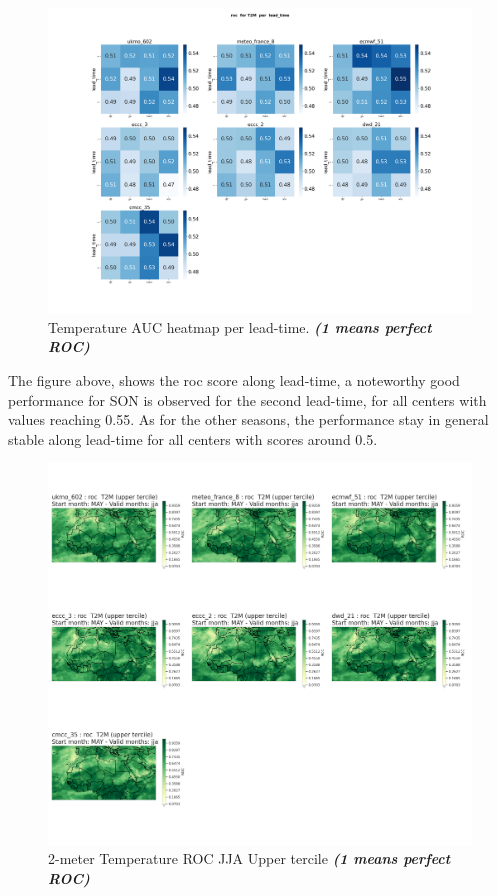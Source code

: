 \begin{figure}[H]
    \centering
    \includegraphics[width=1\linewidth]{plots/prob/roc/roc_T2M_lead_time.png}
    \caption{Temperature AUC  heatmap per lead-time. \textbf{\textit{(1 means perfect ROC)}}}
\end{figure}
The figure above, shows the roc score along lead-time, a noteworthy good performance for SON is observed for the second lead-time, for all centers with values reaching 0.55. As for the other seasons, the performance stay in general stable along lead-time for all centers with scores around 0.5.


\begin{figure}[H]
    \centering
    \includegraphics[width=1\linewidth]{plots/prob/roc/roc_jja_t2m_upper.png}
    \caption{2-meter Temperature ROC JJA Upper tercile \textbf{\textit{(1 means perfect ROC)}}}
\end{figure}


